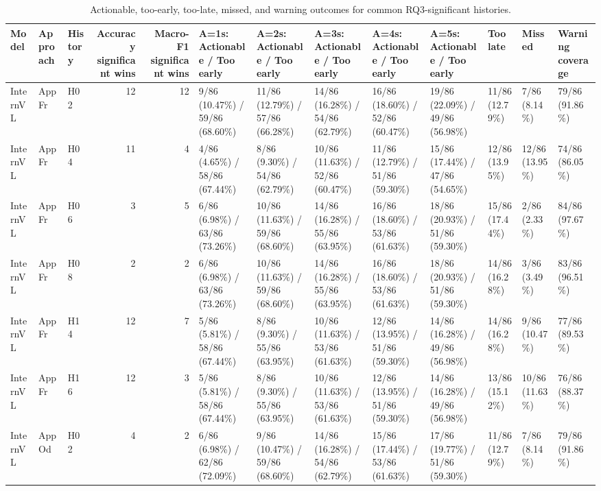 \begin{table}
\caption{Actionable, too-early, too-late, missed, and warning outcomes for common RQ3-significant histories.}
\label{tab:rq3-common-histories-rq4-warning-summary}
\begin{tabular}{lllrrllllllll}
\toprule
Model & Approach & History & Accuracy significant wins & Macro-F1 significant wins & A=1s: Actionable / Too early & A=2s: Actionable / Too early & A=3s: Actionable / Too early & A=4s: Actionable / Too early & A=5s: Actionable / Too early & Too late & Missed & Warning coverage \\
\midrule
InternVL & AppFr & H02 & 12 & 12 & 9/86 (10.47\%) / 59/86 (68.60\%) & 11/86 (12.79\%) / 57/86 (66.28\%) & 14/86 (16.28\%) / 54/86 (62.79\%) & 16/86 (18.60\%) / 52/86 (60.47\%) & 19/86 (22.09\%) / 49/86 (56.98\%) & 11/86 (12.79\%) & 7/86 (8.14\%) & 79/86 (91.86\%) \\
InternVL & AppFr & H04 & 11 & 4 & 4/86 (4.65\%) / 58/86 (67.44\%) & 8/86 (9.30\%) / 54/86 (62.79\%) & 10/86 (11.63\%) / 52/86 (60.47\%) & 11/86 (12.79\%) / 51/86 (59.30\%) & 15/86 (17.44\%) / 47/86 (54.65\%) & 12/86 (13.95\%) & 12/86 (13.95\%) & 74/86 (86.05\%) \\
InternVL & AppFr & H06 & 3 & 5 & 6/86 (6.98\%) / 63/86 (73.26\%) & 10/86 (11.63\%) / 59/86 (68.60\%) & 14/86 (16.28\%) / 55/86 (63.95\%) & 16/86 (18.60\%) / 53/86 (61.63\%) & 18/86 (20.93\%) / 51/86 (59.30\%) & 15/86 (17.44\%) & 2/86 (2.33\%) & 84/86 (97.67\%) \\
InternVL & AppFr & H08 & 2 & 2 & 6/86 (6.98\%) / 63/86 (73.26\%) & 10/86 (11.63\%) / 59/86 (68.60\%) & 14/86 (16.28\%) / 55/86 (63.95\%) & 16/86 (18.60\%) / 53/86 (61.63\%) & 18/86 (20.93\%) / 51/86 (59.30\%) & 14/86 (16.28\%) & 3/86 (3.49\%) & 83/86 (96.51\%) \\
InternVL & AppFr & H14 & 12 & 7 & 5/86 (5.81\%) / 58/86 (67.44\%) & 8/86 (9.30\%) / 55/86 (63.95\%) & 10/86 (11.63\%) / 53/86 (61.63\%) & 12/86 (13.95\%) / 51/86 (59.30\%) & 14/86 (16.28\%) / 49/86 (56.98\%) & 14/86 (16.28\%) & 9/86 (10.47\%) & 77/86 (89.53\%) \\
InternVL & AppFr & H16 & 12 & 3 & 5/86 (5.81\%) / 58/86 (67.44\%) & 8/86 (9.30\%) / 55/86 (63.95\%) & 10/86 (11.63\%) / 53/86 (61.63\%) & 12/86 (13.95\%) / 51/86 (59.30\%) & 14/86 (16.28\%) / 49/86 (56.98\%) & 13/86 (15.12\%) & 10/86 (11.63\%) & 76/86 (88.37\%) \\
InternVL & AppOd & H02 & 4 & 2 & 6/86 (6.98\%) / 62/86 (72.09\%) & 9/86 (10.47\%) / 59/86 (68.60\%) & 14/86 (16.28\%) / 54/86 (62.79\%) & 15/86 (17.44\%) / 53/86 (61.63\%) & 17/86 (19.77\%) / 51/86 (59.30\%) & 11/86 (12.79\%) & 7/86 (8.14\%) & 79/86 (91.86\%) \\

\end{tabular}
\end{table}
